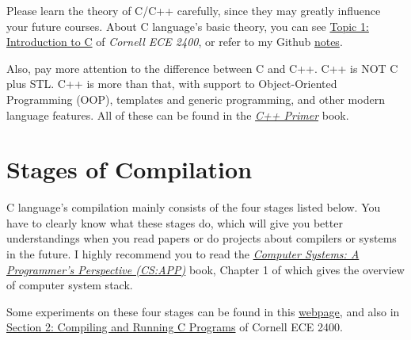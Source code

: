 \documentclass[english]{../TexTemplate/thesis}
\begin{document}
Please learn the theory of C/C++ carefully, since they may greatly influence your future courses.
About C language's basic theory, you can see \href{https://cornell-ece2400.github.io/ece2400-docs/ece2400-T01-intro-c/}{Topic 1: Introduction to C} of \emph{Cornell ECE 2400}, or refer to my Github \href{https://github.com/chhzh123/CS-Notes/tree/master/C-Programming}{notes}.

Also, pay more attention to the difference between C and C++.
C++ is NOT C plus STL.
C++ is more than that, with support to Object-Oriented Programming (OOP), templates and generic programming, and other modern language features.
All of these can be found in the \href{https://book.douban.com/subject/25708312/}{\emph{C++ Primer}} book.

\section{Stages of Compilation}
C language's compilation mainly consists of the four stages listed below.
You have to clearly know what these stages do, which will give you better understandings when you read papers or do projects about compilers or systems in the future.
I highly recommend you to read the \href{https://csapp.cs.cmu.edu/}{\emph{Computer Systems: A Programmer's Perspective (CS:APP)}} book, Chapter 1 of which gives the overview of computer system stack.
\begin{center}
\end{center}

Some experiments on these four stages can be found in this \href{https://www.calleerlandsson.com/the-four-stages-of-compiling-a-c-program/}{webpage}, and also in \href{https://cornell-ece2400.github.io/ece2400-docs/ece2400-sec2-c-basics/}{Section 2: Compiling and Running C Programs} of Cornell ECE 2400.
\end{document}
